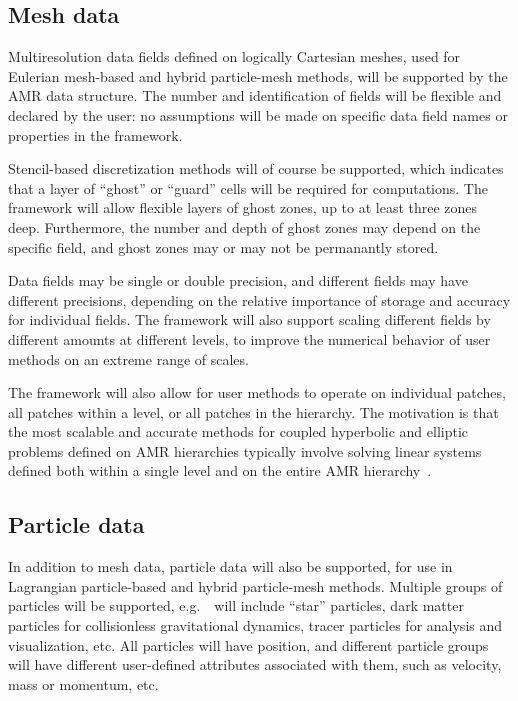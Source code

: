 \documentclass{article}
\begin{document}
\subsection{Mesh data}

Multiresolution data fields defined on logically Cartesian meshes,
used for Eulerian mesh-based and hybrid particle-mesh methods, will be
supported by the AMR data structure.  The number and identification of
fields will be flexible and declared by the user: no assumptions will
be made on specific data field names or properties in the framework.

Stencil-based discretization methods will of course be supported,
which indicates that a layer of ``ghost'' or ``guard'' cells will be
required for computations.  The framework will allow flexible layers
of ghost zones, up to at least three zones deep.  Furthermore, the number and
depth of ghost zones may depend on the specific field, and ghost zones
may or may not be permanantly stored.

Data fields may be single or double precision, and different fields
may have different precisions, depending on the relative importance of
storage and accuracy for individual fields.  The framework will also
support scaling different fields by different amounts at different
levels, to improve the numerical behavior of user methods on an
extreme range of scales.

The framework will also allow for user methods to operate on
individual patches, all patches within a level, or all patches in the
hierarchy.  The motivation is that the most scalable and accurate
methods for coupled hyperbolic and elliptic problems defined on AMR
hierarchies typically involve solving linear systems defined both
within a single level and on the entire AMR hierarchy~\cite{MiCo07}.


\subsection{Particle data}

In addition to mesh data, particle data will also be supported, for
use in Lagrangian particle-based and hybrid particle-mesh methods.
Multiple groups of particles will be supported, e.g.~\enzoii\ will
include ``star'' particles, dark matter particles for collisionless
gravitational dynamics, tracer particles for analysis and
visualization, etc.  All particles will have position, and different particle
groups will have different user-defined attributes associated with them, such
as velocity, mass or momentum, etc.
\end{document}
